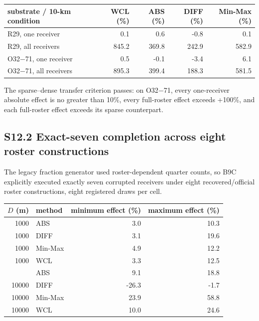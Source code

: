 \documentclass[journal,onecolumn,10pt]{IEEEtran}
\begin{document}
\begin{center}\begin{minipage}{\textwidth}\centering
{}

\begin{tabular}{@{}lrrrr@{}}
\toprule
substrate / 10-km condition & WCL (\%) & ABS (\%) & DIFF (\%) & Min-Max (\%) \\
\midrule

R29, one receiver & 0.1 & 0.6 & -0.8 & 0.1 \\
R29, all receivers & 845.2 & 369.8 & 242.9 & 582.9 \\
O32$-$71, one receiver & 0.5 & -0.1 & -3.4 & 6.1 \\
O32$-$71, all receivers & 895.3 & 399.4 & 188.3 & 581.5 \\
\bottomrule
\end{tabular}
\end{minipage}\end{center}

The sparse--dense transfer criterion passes: on O32$-$71, every one-receiver absolute effect is no greater than 10\%, every full-roster effect exceeds +100\%, and each full-roster effect exceeds its sparse counterpart.

\subsection*{S12.2 Exact-seven completion across eight roster constructions}

The legacy fraction generator used roster-dependent quarter counts, so B9C explicitly executed exactly seven corrupted receivers under eight recovered/official roster constructions, eight registered draws per cell.

\begin{center}\begin{minipage}{\textwidth}\centering
{}

\begin{tabular}{@{}rlrr@{}}
\toprule
$D$ (m) & method & minimum effect (\%) & maximum effect (\%) \\
\midrule

1000 & ABS & 3.0 & 10.3 \\
1000 & DIFF & 3.1 & 19.6 \\
1000 & Min-Max & 4.9 & 12.2 \\
1000 & WCL & 3.3 & 12.5 \\
\addlinespace[4pt]\midrule
10000 & ABS & 9.1 & 18.8 \\
10000 & DIFF & -26.3 & -1.7 \\
10000 & Min-Max & 23.9 & 58.8 \\
10000 & WCL & 10.0 & 24.6 \\
\bottomrule
\end{tabular}
\end{minipage}\end{center}
\end{document}
